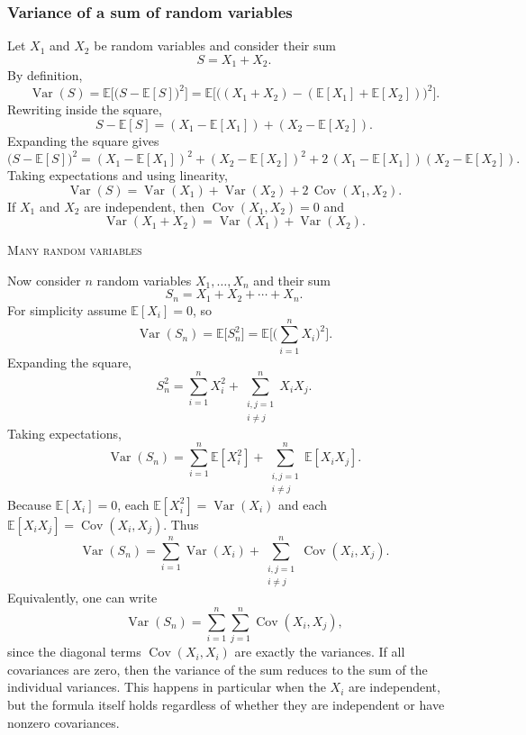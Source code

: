 \subsubsection{Variance of a sum of random variables}

Let \(X_1\) and \(X_2\) be random variables and consider their sum
\[
S = X_1 + X_2.
\]
By definition,
\[
\operatorname{Var}(S)
=
\mathbb{E}\Big[\big(S-\mathbb{E}[S]\big)^{2}\Big]
=
\mathbb{E}\Big[\big((X_1+X_2)-(\mathbb{E}[X_1]+\mathbb{E}[X_2])\big)^{2}\Big].
\]
Rewriting inside the square,
\[
S-\mathbb{E}[S]
=
(X_1-\mathbb{E}[X_1]) + (X_2-\mathbb{E}[X_2]).
\]
Expanding the square gives
\[
\big(S-\mathbb{E}[S]\big)^{2}
=
(X_1-\mathbb{E}[X_1])^{2}
+
(X_2-\mathbb{E}[X_2])^{2}
+
2\,(X_1-\mathbb{E}[X_1])(X_2-\mathbb{E}[X_2]).
\]
Taking expectations and using linearity,
\[
\operatorname{Var}(S)
=
\operatorname{Var}(X_1)
+
\operatorname{Var}(X_2)
+
2\,\operatorname{Cov}(X_1,X_2).
\]
If \(X_1\) and \(X_2\) are independent, then \(\operatorname{Cov}(X_1,X_2)=0\) and
\[
\operatorname{Var}(X_1+X_2)
=
\operatorname{Var}(X_1)+\operatorname{Var}(X_2).
\]

\bigskip
\textsc{Many random variables}

Now consider \(n\) random variables \(X_1,\dots,X_n\) and their sum
\[
S_n = X_1 + X_2 + \cdots + X_n.
\]
For simplicity assume \(\mathbb{E}[X_i]=0\), so
\[
\operatorname{Var}(S_n)
=
\mathbb{E}\big[S_n^{2}\big]
=
\mathbb{E}\Big[\Big(\sum_{i=1}^{n} X_i\Big)^{2}\Big].
\]
Expanding the square,
\[
S_n^{2}
=
\sum_{i=1}^{n} X_i^{2}
+
\sum_{\substack{i,j=1\\ i\ne j}}^{n} X_iX_j.
\]
Taking expectations,
\[
\operatorname{Var}(S_n)
=
\sum_{i=1}^{n} \mathbb{E}[X_i^{2}]
+
\sum_{\substack{i,j=1\\ i\ne j}}^{n} \mathbb{E}[X_iX_j].
\]
Because \(\mathbb{E}[X_i]=0\), each \(\mathbb{E}[X_i^{2}] = \operatorname{Var}(X_i)\) and each \(\mathbb{E}[X_iX_j] = \operatorname{Cov}(X_i,X_j)\).  
Thus
\[
\operatorname{Var}(S_n)
=
\sum_{i=1}^{n} \operatorname{Var}(X_i)
+
\sum_{\substack{i,j=1\\ i\ne j}}^{n} \operatorname{Cov}(X_i,X_j).
\]
Equivalently, one can write
\[
\operatorname{Var}(S_n)
=
\sum_{i=1}^{n} \sum_{j=1}^{n} \operatorname{Cov}(X_i,X_j),
\]
since the diagonal terms \(\operatorname{Cov}(X_i,X_i)\) are exactly the variances.  
If all covariances are zero, then the variance of the sum reduces to the sum of the individual variances.  
This happens in particular when the \(X_i\) are independent, but the formula itself holds regardless of whether they are independent or have nonzero covariances.



